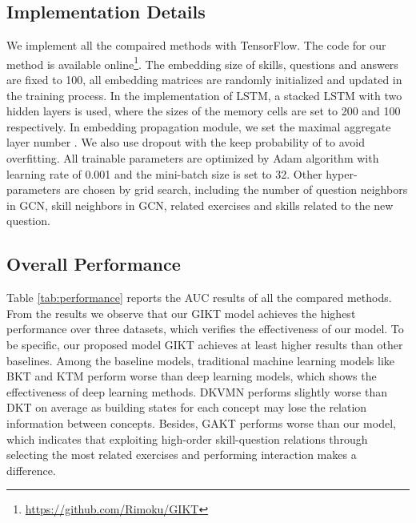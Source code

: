\documentclass[runningheads]{llncs}
\begin{document}
\subsection{Implementation Details}
We implement all the compaired methods with TensorFlow. The code for our method is available online\footnote{\url{https://github.com/Rimoku/GIKT} }.
The embedding size of skills, questions and answers are fixed to 100, all embedding matrices are randomly initialized and updated in the training process. In the implementation of LSTM, a stacked LSTM with two hidden layers is used, where the sizes of the memory cells are set to 200 and 100 respectively. In embedding propagation module, we set the maximal aggregate layer number . We also use dropout with the keep probability of  to avoid overfitting. All trainable parameters are optimized by Adam algorithm\cite{kingma2014adam} with learning rate of 0.001 and the mini-batch size is set to 32. Other hyper-parameters are chosen by grid search, including the number of question neighbors in GCN, skill neighbors in GCN, related exercises and skills related to the new question. 


\subsection{Overall Performance}
Table \ref{tab:performance} reports the AUC results of all the compared methods. From the results we observe that our GIKT model achieves the highest performance over three datasets, which verifies the effectiveness of our model. To be specific, our proposed model GIKT achieves at least  higher results than other baselines. Among the baseline models, traditional machine learning models like BKT and KTM perform worse than deep learning models, which shows the effectiveness of deep learning methods. DKVMN performs slightly worse than DKT on average as building states for each concept may lose the relation information between concepts. Besides, GAKT performs worse than our model, which indicates that exploiting high-order skill-question relations through selecting the most related exercises and performing interaction makes a difference.
\end{document}
